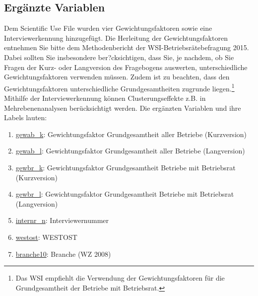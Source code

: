 \subsection{Ergänzte Variablen}\label{var_ergaenzt}

Dem Scientific Use File wurden vier Gewichtungsfaktoren sowie eine Interviewerkennung hinzugefügt. Die Herleitung der Gewichtungsfaktoren entnehmen Sie bitte dem Methodenbericht der WSI-Betriebsrätebefragung 2015. Dabei sollten Sie insbesondere ber?cksichtigen, dass Sie, je nachdem, ob Sie Fragen der Kurz- oder Langversion des Fragebogens auswerten, unterschiedliche Gewichtungsfaktoren verwenden müssen. Zudem ist zu beachten, dass den Gewichtungsfaktoren unterschiedliche Grundgesamtheiten zugrunde liegen.\footnote{Das WSI empfiehlt die Verwendung der Gewichtungsfaktoren für die Grundgesamtheit der Betriebe mit Betriebsrat.} Mithilfe der Interviewerkennung können Clusterungseffekte z.B. in Mehrebenenanalysen berücksichtigt werden. Die ergänzten Variablen und ihre Labels lauten:

\begin{enumerate}

\item \hyperref[var:suf:gewab:k]{gewab\_k}: Gewichtungsfaktor Grundgesamtheit aller Betriebe (Kurzversion)
\item \hyperref[var:suf:gewab:l]{gewab\_l}: Gewichtungsfaktor Grundgesamtheit aller Betriebe (Langversion)
\item \hyperref[var:suf:gewbr:k]{gewbr\_k}: Gewichtungsfaktor Grundgesamtheit Betriebe mit Betriebsrat (Kurzversion)
\item \hyperref[var:suf:gewbr:l]{gewbr\_l}: Gewichtungsfaktor Grundgesamtheit Betriebe mit Betriebsrat (Langversion)
\item \hyperref[var:suf:internr:n]{internr\_n}: Interviewernummer
\item \hyperref[var:suf:westost]{westost}: WESTOST
\item \hyperref[var:suf:branche10]{branche10}: Branche (WZ 2008)

\end{enumerate}
